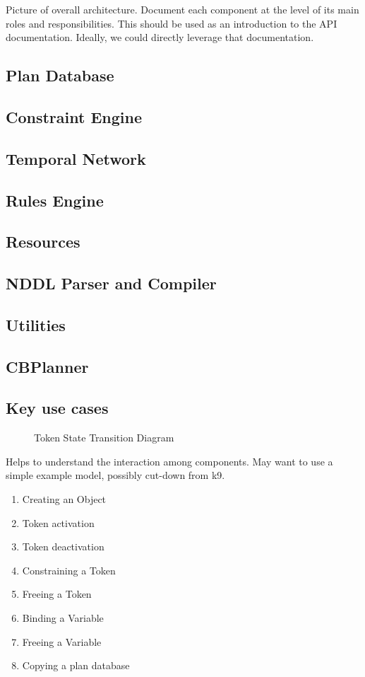\documentclass[10pt, letterpaper, twoside]{article}
\begin{document}
Picture of overall architecture. Document each component at the level
of its main roles and responsibilities. This should be used as an
introduction to the API documentation. Ideally, we could directly
leverage that documentation.
\subsection{Plan Database}
\subsection{Constraint Engine}
\subsection{Temporal Network}
\subsection{Rules Engine}
\subsection{Resources}
\subsection{NDDL Parser and Compiler}
\subsection{Utilities}
\subsection{CBPlanner}
\subsection{Key use cases}


\begin{figure}[t]
\centering{}
\caption{Token State Transition Diagram}
\label{TokenStateModel}
\end{figure}

Helps to understand the interaction among components. May want to use
a simple example model, possibly cut-down from k9.
\begin{enumerate}
\item Creating an Object
\item Token activation
\item Token deactivation
\item Constraining a Token
\item Freeing a Token
\item Binding a Variable
\item Freeing a Variable
\item Copying a plan database
\end{enumerate}
\end{document}
